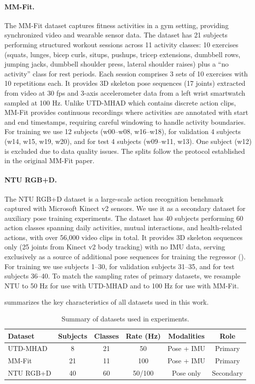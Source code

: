 \paragraph{MM-Fit.}
The MM-Fit dataset \cite{stromback2020mm} captures fitness activities in a gym setting, providing synchronized video and wearable sensor data. The dataset has 21 subjects performing structured workout sessions across 11 activity classes: 10 exercises (squats, lunges, bicep curls, situps, pushups, tricep extensions, dumbbell rows, jumping jacks, dumbbell shoulder press, lateral shoulder raises) plus a ``no activity'' class for rest periods. Each session comprises 3 sets of 10 exercises with 10 repetitions each. It provides 3D skeleton pose sequences (17 joints) extracted from video at 30 fps and 3-axis accelerometer data from a left wrist smartwatch sampled at 100 Hz. Unlike UTD-MHAD which contains discrete action clips, MM-Fit provides continuous recordings where activities are annotated with start and end timestamps, requiring careful windowing to handle activity boundaries. For training we use 12 subjects (w00--w08, w16--w18), for validation 4 subjects (w14, w15, w19, w20), and for test 4 subjects (w09--w11, w13). One subject (w12) is excluded due to data quality issues. The splits follow the protocol established in the original MM-Fit paper.

\paragraph{NTU RGB+D.}
The NTU RGB+D dataset \cite{shahroudy2016ntu} is a large-scale action recognition benchmark captured with Microsoft Kinect v2 sensors. We use it as a secondary dataset for auxiliary pose training experiments. The dataset has 40 subjects performing 60 action classes spanning daily activities, mutual interactions, and health-related actions, with over 56,000 video clips in total. It provides 3D skeleton sequences only (25 joints from Kinect v2 body tracking) with no IMU data, serving exclusively as a source of additional pose sequences for training the regressor (). For training we use subjects 1--30, for validation subjects 31--35, and for test subjects 36--40. To match the sampling rates of primary datasets, we resample NTU to 50 Hz for use with UTD-MHAD and to 100 Hz for use with MM-Fit.

 summarizes the key characteristics of all datasets used in this work.

\begin{table}[!t]
\centering
\caption{Summary of datasets used in experiments.}
\label{tab:dataset-summary}
\begin{tabular}{lccccc}
\hline
\textbf{Dataset} & \textbf{Subjects} & \textbf{Classes} & \textbf{Rate (Hz)} & \textbf{Modalities} & \textbf{Role} \\
\hline
UTD-MHAD & 8 & 21 & 50 & Pose + IMU & Primary \\
MM-Fit & 21 & 11 & 100 & Pose + IMU & Primary \\
NTU RGB+D & 40 & 60 & 50/100 & Pose only & Secondary \\
\hline
\end{tabular}
\end{table}

